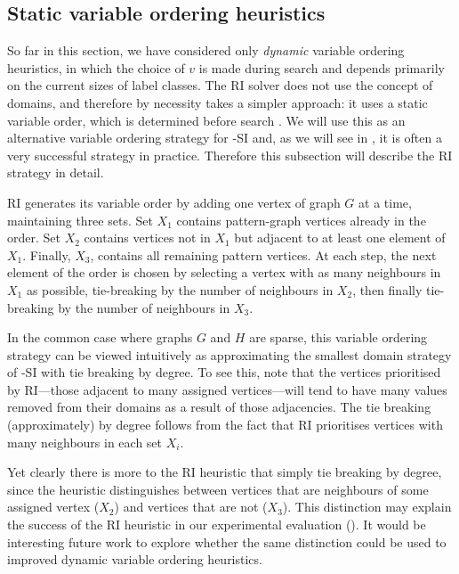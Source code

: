 \subsection{Static variable ordering heuristics}

So far in this section, we have considered only \emph{dynamic} variable
ordering heuristics, in which the choice of $v$ is made during search and
depends primarily on the current sizes of label classes.  The RI solver does
not use the concept of domains, and therefore by necessity takes a simpler
approach: it uses a static variable order, which is determined before search
\citep{DBLP:journals/tcbb/BonniciG17}.  We will use this as an alternative
variable ordering strategy for \McSplit-SI and, as we will see in
, it is often a very successful strategy in practice.
Therefore this subsection will describe the RI strategy in detail.

RI generates its variable order by adding one vertex of graph $G$ at a time,
maintaining three sets.  Set $X_1$ contains pattern-graph vertices already in
the order. Set $X_2$ contains vertices not in $X_1$ but adjacent to at least
one element of $X_1$.  Finally, $X_3$, contains all remaining pattern vertices.
At each step, the next element of the order is chosen by selecting a vertex
with as many neighbours in $X_1$ as possible, tie-breaking by the number of
neighbours in $X_2$, then finally tie-breaking by the number of neighbours in
$X_3$.

In the common case where graphs $G$ and $H$ are sparse, this variable
ordering strategy can be viewed intuitively as approximating the smallest
domain strategy of \McSplit-SI with tie breaking by degree.  To see this, note
that the vertices prioritised by RI---those adjacent to many assigned
vertices---will tend to have many values removed from their domains as a result
of those adjacencies.  The tie breaking (approximately) by degree follows from
the fact that RI prioritises vertices with many neighbours in each set $X_i$.

Yet clearly there is more to the RI heuristic that simply tie breaking by
degree, since the heuristic distinguishes between vertices that are neighbours
of some assigned vertex ($X_2$) and vertices that are not ($X_3$). This
distinction may explain the success of the RI heuristic in our experimental
evaluation ().  It would be interesting future work to
explore whether the same distinction could be used to improved dynamic variable
ordering heuristics.

